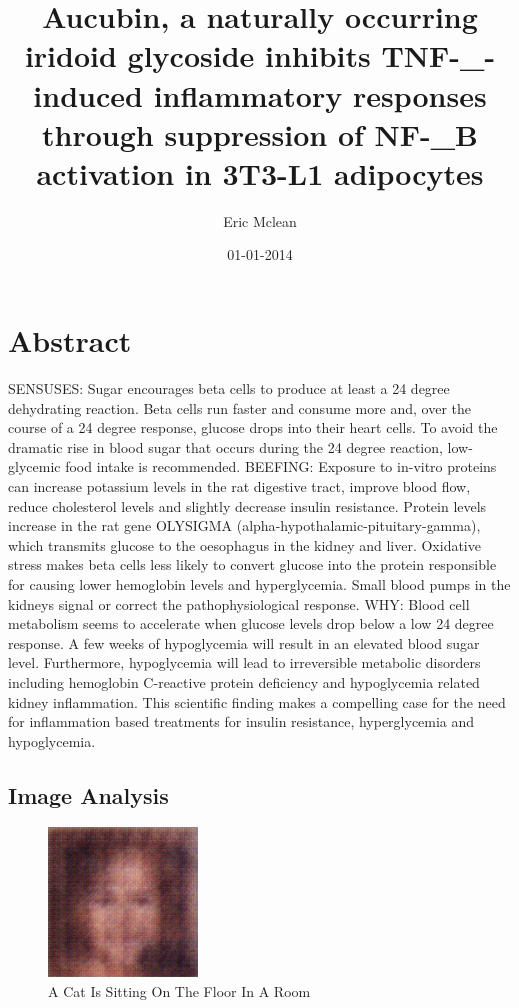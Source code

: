 \documentclass{article}%
\title{Aucubin, a naturally occurring iridoid glycoside inhibits TNF{-}\_{-}induced inflammatory responses through suppression of NF{-}\_B activation in 3T3{-}L1 adipocytes}%
\author{Eric Mclean}%
\affil{Department of Biochemistry and Molecular Biology, Bengbu Medical College, Bengbu, Anhui, China}%
\date{01{-}01{-}2014}%
\begin{document}
%
\normalsize%
\maketitle%
\section{Abstract}%
\label{sec:Abstract}%
SENSUSES: Sugar encourages beta cells to produce at least a 24 degree dehydrating reaction. Beta cells run faster and consume more and, over the course of a 24 degree response, glucose drops into their heart cells. To avoid the dramatic rise in blood sugar that occurs during the 24 degree reaction, low{-}glycemic food intake is recommended.\newline%
BEEFING: Exposure to in{-}vitro proteins can increase potassium levels in the rat digestive tract, improve blood flow, reduce cholesterol levels and slightly decrease insulin resistance. Protein levels increase in the rat gene OLYSIGMA (alpha{-}hypothalamic{-}pituitary{-}gamma), which transmits glucose to the oesophagus in the kidney and liver. Oxidative stress makes beta cells less likely to convert glucose into the protein responsible for causing lower hemoglobin levels and hyperglycemia. Small blood pumps in the kidneys signal or correct the pathophysiological response.\newline%
WHY: Blood cell metabolism seems to accelerate when glucose levels drop below a low 24 degree response. A few weeks of hypoglycemia will result in an elevated blood sugar level. Furthermore, hypoglycemia will lead to irreversible metabolic disorders including hemoglobin C{-}reactive protein deficiency and hypoglycemia related kidney inflammation. This scientific finding makes a compelling case for the need for inflammation based treatments for insulin resistance, hyperglycemia and hypoglycemia.

%
\subsection{Image Analysis}%
\label{subsec:ImageAnalysis}%


\begin{figure}[h!]%
\centering%
\includegraphics[width=150px]{500_fake_images/samples_5_50.png}%
\caption{A Cat Is Sitting On The Floor In A Room}%
\end{figure}

%
\end{document}

